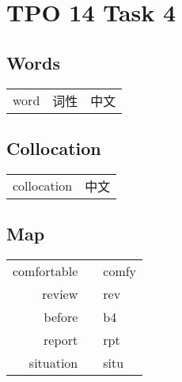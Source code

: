 \section{TPO 14 Task 4}

\subsection{Words}

\begin{tabular}{lll}
    word & 词性 & 中文 \\
\end{tabular}

\subsection{Collocation}

\begin{tabular}{ll}
    collocation & 中文 \\
\end{tabular}

\subsection{Map}

\begin{tabular}{rc@{\quad$\to$\quad}l}
    comfortable &  & comfy \\
    review      &  & rev   \\
    before      &  & b4    \\
    report      &  & rpt   \\
    situation   &  & situ  \\
\end{tabular}

